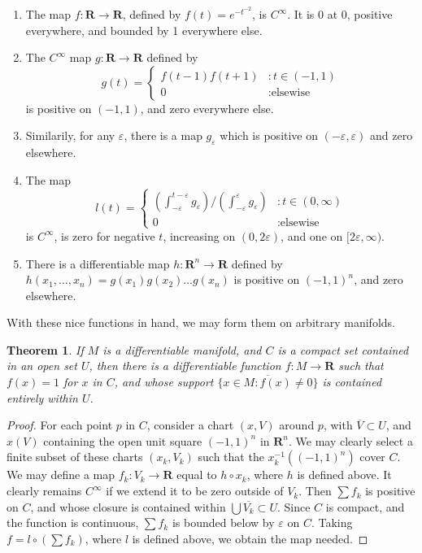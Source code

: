 \documentclass[12pt]{report}
\theoremstyle{plain}
\newtheorem{theorem}{Theorem}[chapter]
\theoremstyle{definition}
\begin{document}
\begin{enumerate}
    \item The map $f:\mathbf{R} \to \mathbf{R}$, defined by $f(t) = e^{-t^{-2}}$, is $C^\infty$. It is 0 at 0, positive everywhere, and bounded by 1 everywhere else.
    \item The $C^\infty$ map $g:\mathbf{R} \to \mathbf{R}$ defined by
    \[
    g(t) =
    \begin{cases} 
        f(t - 1)f(t + 1) & : t \in (-1, 1) \\
        0 & : \text{elsewise}
    \end{cases}
    \]
    is positive on $(-1,1)$, and zero everywhere else.
    \item Similarily, for any $\varepsilon$, there is a map $g_\varepsilon$ which is positive on $(-\varepsilon, \varepsilon)$ and zero elsewhere.
    \item The map 
    \[ l(t) = \begin{cases}
        \left(\int_{-\varepsilon}^{t - \varepsilon} g_\varepsilon \right)/\left(\int_{-\varepsilon}^\varepsilon g_\varepsilon \right) & : t \in (0, \infty) \\
        0 & : \text{elsewise}
    \end{cases} \]
    is $C^\infty$, is zero for negative $t$, increasing on $(0, 2\varepsilon)$, and one on $[2\varepsilon, \infty)$.
    \item There is a differentiable map $h:\mathbf{R}^n \to \mathbf{R}$ defined by $h(x_1, \dots, x_n) = g(x_1) g(x_2) \dots g(x_n)$ is positive on $(-1, 1)^n$, and zero elsewhere.
\end{enumerate}

With these nice functions in hand, we may form them on arbitrary manifolds.

\begin{theorem}
    If $M$ is a differentiable manifold, and $C$ is a compact set contained in an open set $U$, then there is a differentiable function $f:M \to \mathbf{R}$ such that $f(x) = 1$ for $x$ in $C$, and whose support $\overline{\{ x \in M : f(x) \neq 0 \}}$ is contained entirely within $U$.
\end{theorem}
\begin{proof}
    For each point $p$ in $C$, consider a chart $(x,V)$ around $p$, with $\overline{V} \subset U$, and $x(V)$ containing the open unit square $(-1,1)^n$ in $\mathbf{R}^n$. We may clearly select a finite subset of these charts $(x_k,V_k)$ such that the $x_k^{-1}((-1,1)^n)$ cover $C$. We may define a map $f_k:V_k \to \mathbf{R}$ equal to $h \circ x_k$, where $h$ is defined above. It clearly remains $C^\infty$ if we extend it to be zero outside of $V_k$. Then $\sum f_k$ is positive on $C$, and whose closure is contained within $\bigcup \overline{V_k} \subset U$. Since $C$ is compact, and the function is continuous, $\sum f_k$ is bounded below by $\varepsilon$ on $C$. Taking $f = l \circ (\sum f_k)$, where $l$ is defined above, we obtain the map needed.
\end{proof}
\end{document}

